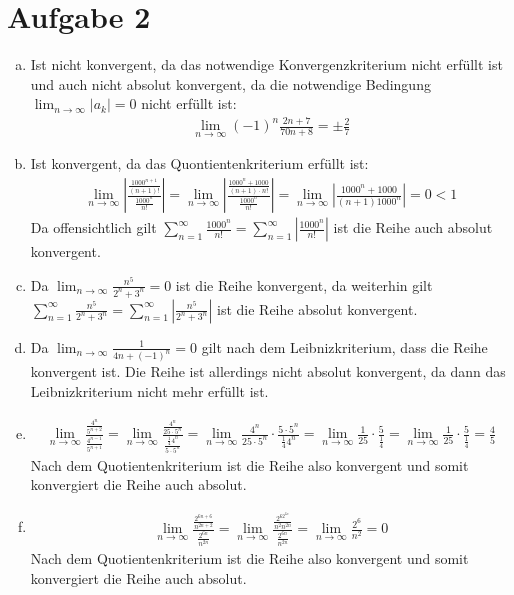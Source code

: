 \documentclass[10pt,a4paper,parskip=half]{scrartcl}
\begin{document}
\section*{Aufgabe 2}
\begin{enumerate}[a)]
	\item 
	Ist nicht konvergent, da das notwendige Konvergenzkriterium nicht erfüllt ist und auch nicht absolut konvergent, da die notwendige Bedingung $\lim_{n\to\infty} |a_k| = 0$ nicht erfüllt ist:
		\begin{align*} 
			\lim_{n \to \infty} (-1)^n\frac{2n+7}{70n + 8} = \pm \frac 27 
		\end{align*}
         \item 
         Ist konvergent, da das Quontientenkriterium erfüllt ist:
            \begin{align*} 
               \lim_{n \to \infty} \left|\frac{\frac{1000^{n+1}}{(n+1)!}}{\frac{1000^n}{n!}}\right| = \lim_{n \to \infty} \left|\frac{\frac{1000^{n} + 1000}{(n+1) \cdot n!}}{\frac{1000^n}{n!}}\right| = \lim_{n \to \infty} \left|\frac{1000^{n} + 1000}{(n+1) 1000^n}\right| = 0 < 1
            \end{align*}
         Da offensichtlich gilt $\sum_{n=1}^{\infty}\frac{1000^n}{n!} =  \sum_{n=1}^{\infty}\left|\frac{1000^n}{n!}\right|$  ist die Reihe auch absolut konvergent.
         \item 
         Da $\lim_{n \to \infty} \frac{n^5}{2^n+3^n} = 0$ ist die Reihe konvergent, da weiterhin gilt $\sum_{n=1}^{\infty}\frac{n^5}{2^n+3^n}  =  \sum_{n=1}^{\infty}\left|\frac{n^5}{2^n+3^n}\right|$ ist die Reihe absolut konvergent.
         \item 
         Da $\lim_{n \to \infty} \frac{1}{4n + (-1)^n} = 0$ gilt nach dem Leibnizkriterium, dass die Reihe konvergent ist. Die Reihe ist allerdings nicht absolut konvergent, da dann das Leibnizkriterium nicht mehr erfüllt ist.
\item
\begin{align*}
\lim_{n\to\infty} \frac{\frac{4^{n}}{5^{n+2}}}{\frac{4^{n-1}}{5^{n+1}}} = \lim_{n\to\infty} \frac{\frac{4^{n}}{25\cdot5^{n}}}{\frac{\frac 1 4 4^{n}}{5\cdot5^{n}}} = \lim_{n\to\infty}\frac{4^{n}}{25\cdot5^{n}} \cdot \frac{5\cdot5^{n}}{\frac 1 4 4^{n}} = \lim_{n\to\infty}\frac{1}{25} \cdot \frac{5}{\frac 1 4} = \lim_{n\to\infty}\frac{1}{25} \cdot \frac{5}{\frac 1 4} = \frac 4 5
\end{align*}
Nach dem Quotientenkriterium ist die Reihe also konvergent und somit konvergiert die Reihe auch absolut.
\item
\begin{align*}
\lim_{n\to\infty} \frac{\frac{2^{6n+6}}{n^{2n+2}}}{\frac{2^{6n}}{n^{2n}}} = \lim_{n\to\infty} \frac{\frac{2^62^{6n}}{n^2n^{2n}}}{\frac{2^{6n}}{n^{2n}}} = \lim_{n\to\infty} \frac{2^6}{n^2} = 0 
\end{align*}
Nach dem Quotientenkriterium ist die Reihe also konvergent und somit konvergiert die Reihe auch absolut.
\end{enumerate}
\end{document}
